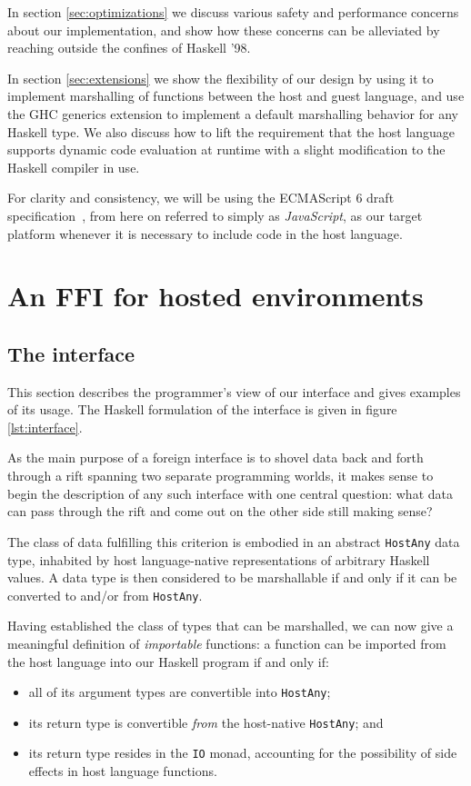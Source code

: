 \documentclass[preprint]{sigplanconf}
\begin{document}
In section \ref{sec:optimizations} we discuss various safety and performance
concerns about our implementation, and show how these concerns can be
alleviated by reaching outside the confines of Haskell '98.

In section \ref{sec:extensions} we show the flexibility of our design by using
it to implement marshalling of functions between the host and guest language,
and use the GHC generics extension to implement a default marshalling behavior
for any Haskell type. We also discuss how to lift the requirement that the host
language supports dynamic code evaluation at runtime with a slight
modification to the Haskell compiler in use.

For clarity and consistency, we will be using the ECMAScript 6
draft specification\ \cite{es6}, from here on referred to simply as
\emph{JavaScript}, as our target platform whenever it is necessary to include
code in the host language.

\section{An FFI for hosted environments}\label{sec:interface}
\subsection{The interface}
This section describes the programmer's view of our interface and gives
examples of its usage.
The Haskell formulation of the interface is given in figure \ref{lst:interface}.

As the main purpose of a foreign interface is to shovel data back and
forth through a rift spanning two separate programming worlds, it makes sense
to begin the description of any such interface with one central question:
what data can pass through the rift and come out on the other side still making
sense?

The class of data fulfilling this criterion is embodied in an
abstract \lstinline!HostAny! data type, inhabited by host language-native
representations of arbitrary Haskell values.
A data type is then considered to be marshallable if and only if it can be
converted to and/or from \lstinline!HostAny!.

Having established the class of types that can be marshalled, we can now give
a meaningful definition of \emph{importable} functions: a function can be
imported from the host language into our Haskell program if and only if:
\begin{itemize}
\item
  all of its argument types are convertible into \lstinline!HostAny!;
\item
  its return type is convertible \emph{from} the host-native
  \lstinline!HostAny!; and
\item
  its return type resides in the \lstinline!IO! monad, accounting for the
  possibility of side effects in host language functions.
\end{itemize}
\end{document}
